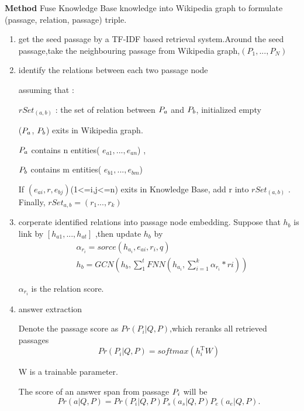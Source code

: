 \documentclass[sigconf]{acmart}
\begin{document}
	\textbf{Method} 
	Fuse Knowledge Base knowledge into Wikipedia graph to formulate
	(passage, relation, passage) triple.
	\begin{enumerate}[(1)]
		\item get the seed passage by a TF-IDF based retrieval system.Around the seed passage,take the neighbouring passage from Wikipedia graph,$(P_1,...,P_N)$
		
		\item identify the relations between each two passage node
		
		assuming that :
				
		$rSet_{(a,b)}$ : the set of relation between $\MakeUppercase{p}_a$ and $\MakeUppercase{p}_b$, initialized empty
		
		($\MakeUppercase{p}_a$, 	$\MakeUppercase{p}_b$) exits in Wikipedia graph.
		
		
		$\MakeUppercase{p}_a$ contains n entities( $e_{a1},...,e_{an}$) ,
		
		$\MakeUppercase{p}_b$ contains m entities( $e_{b1},...,e_{bm}$) 
		
		
		If $(e_{ai}, r, e_{bj})$(1<=i,j<=n) exits in Knowledge Base, add r into $rSet_{(a,b)}$ . Finally, $rSet_{a,b} = (r_{1}...,r_{k}) $
		
		\item corperate identified relations into passage node embedding.	Suppose that  $h_{b}$ is link by  $[h_{a1},...,h_{at}]$ ,then update $h_{b}$ by 
		\begin{displaymath}
			\begin{aligned}
			&\alpha_{r_i} = sorce( h_{a_i},e_{ai},r_i,q) \\		
			&h_{b}= GCN(h_{b}, \sum_{1}^{t}FNN (h_{a_i}, \sum_{i=1}^{k} \alpha_{r_i}*ri))
			\end{aligned}
		\end{displaymath}
		
		$\alpha_{r_i}$ is the relation score.
	

	
	\item answer extraction
		
	Denote the passage score as $Pr(P_i|Q, P)$,which reranks all retrieved passages
		\begin{displaymath}
			Pr(P_i|Q, P) = softmax(h_i^\mathrm{ T }  W)
		\end{displaymath}
			
	W is a trainable parameter.
	
	The score of an answer span from passage $\MakeUppercase{p}_i$ will be
			\begin{displaymath}
			Pr(a| Q, P) = 	Pr(P_i|Q, P)P_s(a_s|Q, P)P_e(a_e|Q, P).
			\end{displaymath}
	
		
		
		
	\end{enumerate} 
   
\end{document}
